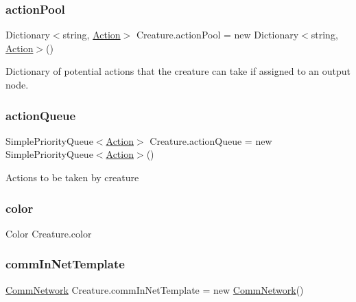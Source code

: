 \subsubsection{\texorpdfstring{action\+Pool}{actionPool}}
{\footnotesize\ttfamily Dictionary$<$string, \mbox{\hyperlink{class_action}{Action}}$>$ Creature.\+action\+Pool = new Dictionary$<$string, \mbox{\hyperlink{class_action}{Action}}$>$()}



Dictionary of potential actions that the creature can take if assigned to an output node. 

\mbox{\label{class_creature_abb099197e9fa2dac396151e4e949214d}} 
\subsubsection{\texorpdfstring{action\+Queue}{actionQueue}}
{\footnotesize\ttfamily Simple\+Priority\+Queue$<$\mbox{\hyperlink{class_action}{Action}}$>$ Creature.\+action\+Queue = new Simple\+Priority\+Queue$<$\mbox{\hyperlink{class_action}{Action}}$>$()}



Actions to be taken by creature 

\mbox{\label{class_creature_a4f2289e79c2db01559984c8797a322c8}} 
\subsubsection{\texorpdfstring{color}{color}}
{\footnotesize\ttfamily Color Creature.\+color}

\mbox{\label{class_creature_a02c2c300201b3515e01e84766e4e02b9}} 
\subsubsection{\texorpdfstring{comm\+In\+Net\+Template}{commInNetTemplate}}
{\footnotesize\ttfamily \mbox{\hyperlink{class_comm_network}{Comm\+Network}} Creature.\+comm\+In\+Net\+Template = new \mbox{\hyperlink{class_comm_network}{Comm\+Network}}()}




